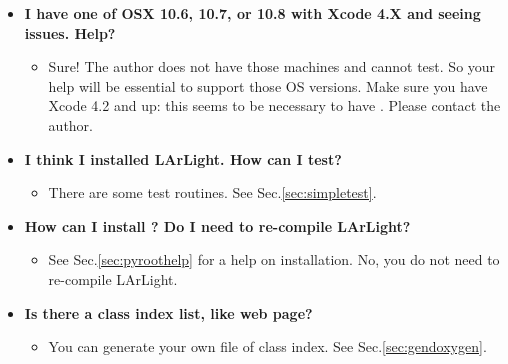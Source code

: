 \begin{itemize}
\item[] {\bf I have one of OSX 10.6, 10.7, or 10.8 with Xcode 4.X and seeing issues. Help?}
  \begin{itemize}
    \item Sure! The author does not have those machines and cannot test. So your
      help will be essential to support those OS versions. Make sure you have Xcode 4.2
      and up: this seems to be necessary to have \clang. Please contact the author.
  \end{itemize}

\item[] {\bf I think I installed LArLight. How can I test?}
  \begin{itemize}
    \item There are some test routines. See Sec.\ref{sec:simpletest}.
  \end{itemize}

\item[] {\bf How can I install \PyROOT? Do I need to re-compile LArLight?}
  \begin{itemize}
    \item See Sec.\ref{sec:pyroothelp} for a help on installation. No, you do not need to re-compile LArLight.
  \end{itemize}

\item[] {\bf Is there a class index list, like \ROOT web page?}
  \begin{itemize}
    \item You can generate your own \HTML file of class index. See Sec.\ref{sec:gendoxygen}.
  \end{itemize}

\end{itemize}



